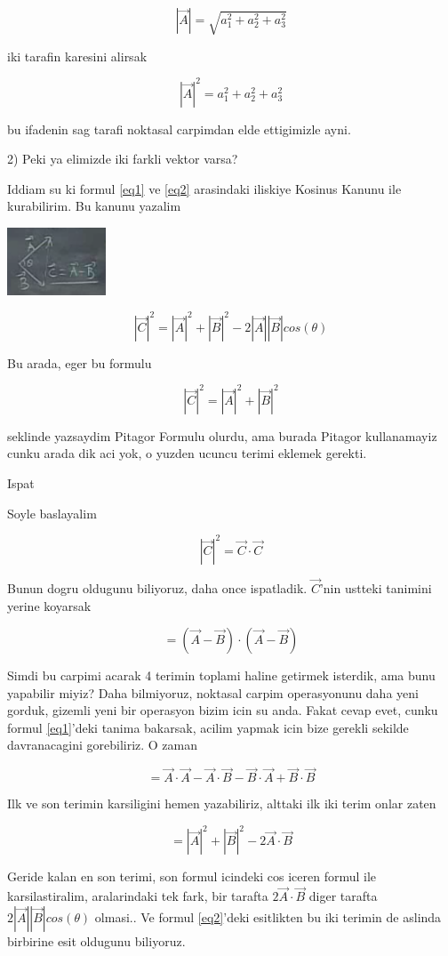 \documentclass[12pt,fleqn]{article}\usepackage{../common}
\begin{document}
\[ |\vec{A}| = \sqrt{a_1 ^2 + a_2^2 + a_3^2} \]

iki tarafin karesini alirsak

\[ |\vec{A}|^2 = a_1 ^2 + a_2^2 + a_3^2\]

bu ifadenin sag tarafi noktasal carpimdan elde ettigimizle ayni. 

2) Peki ya elimizde iki farkli vektor varsa? 

Iddiam su ki formul \ref{eq1} ve \ref{eq2} arasindaki iliskiye Kosinus
Kanunu ile kurabilirim. Bu kanunu yazalim

\includegraphics[height=2cm]{1_11.png}

\[ |\vec{C}|^2 = |\vec{A}|^2 + |\vec{B}|^2 - 2|\vec{A}||\vec{B}|cos(\theta) \]

Bu arada, eger bu formulu 

\[ |\vec{C}|^2 = |\vec{A}|^2 + |\vec{B}|^2  \]

seklinde yazsaydim Pitagor Formulu olurdu, ama burada Pitagor kullanamayiz
cunku arada dik aci yok, o yuzden ucuncu terimi eklemek gerekti. 

Ispat

Soyle baslayalim

\[ |\vec{C}|^2 = \vec{C} \cdot \vec{C} \]

Bunun dogru oldugunu biliyoruz, daha once ispatladik. $\vec{C}$'nin
ustteki tanimini yerine koyarsak

\[ = (\vec{A} - \vec{B}) \cdot (\vec{A} - \vec{B})  \]

Simdi bu carpimi acarak 4 terimin toplami haline getirmek isterdik, ama
bunu yapabilir miyiz? Daha bilmiyoruz, noktasal carpim operasyonunu daha
yeni gorduk, gizemli yeni bir operasyon bizim icin su anda. Fakat cevap
evet, cunku formul \ref{eq1}'deki tanima bakarsak, acilim yapmak icin bize
gerekli sekilde davranacagini gorebiliriz. O zaman

\[  =
\vec{A}\cdot\vec{A} - 
\vec{A}\cdot\vec{B} -
\vec{B}\cdot\vec{A} +
\vec{B}\cdot\vec{B} 
\]

Ilk ve son terimin karsiligini hemen yazabiliriz, alttaki ilk iki terim
onlar zaten

\[ = |\vec{A}|^2 + |\vec{B}|^2 - 2\vec{A} \cdot \vec{B} \]

Geride kalan en son terimi, son formul icindeki cos iceren formul ile
karsilastiralim, aralarindaki tek fark, bir tarafta $2\vec{A} \cdot
\vec{B}$ diger 
tarafta $2|\vec{A}||\vec{B}|cos(\theta)$ olmasi.. Ve formul \ref{eq2}'deki 
esitlikten  bu iki terimin de aslinda birbirine esit oldugunu
biliyoruz. 
\end{document}
